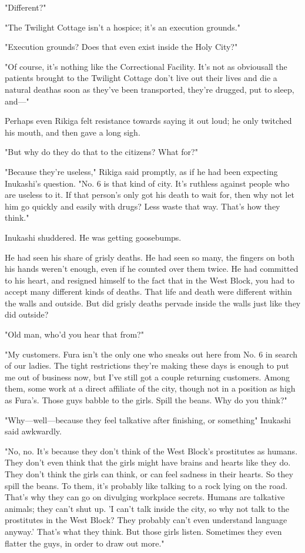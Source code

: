 "Different?"

"The Twilight Cottage isn't a hospice; it's an execution grounds."

"Execution grounds? Does that even exist inside the Holy City?"

"Of course, it's nothing like the Correctional Facility. It's not as
obvious\el all the patients brought to the Twilight Cottage don't live
out their lives and die a natural death\el as soon as they've been
transported, they're drugged, put to sleep, and---"

Perhaps even Rikiga felt resistance towards saying it out loud; he only
twitched his mouth, and then gave a long sigh.

"But why do they do that to the citizens? What for?"

"Because they're useless," Rikiga said promptly, as if he had been
expecting Inukashi's question. "No. 6 is that kind of city. It's
ruthless against people who are useless to it. If that person's only got
his death to wait for, then why not let him go quickly and easily with
drugs? Less waste that way. That's how they think."

Inukashi shuddered. He was getting goosebumps.

He had seen his share of grisly deaths. He had seen so many, the fingers
on both his hands weren't enough, even if he counted over them twice. He
had committed to his heart, and resigned himself to the fact that in the
West Block, you had to accept many different kinds of deaths. That life
and death were different within the walls and outside. But did grisly
deaths pervade inside the walls just like they did outside?

"Old man, who'd you hear that from?"

"My customers. Fura isn't the only one who sneaks out here from No. 6 in
search of our ladies. The tight restrictions they're making these days
is enough to put me out of business now, but I've still got a couple
returning customers. Among them, some work at a direct affiliate of the
city, though not in a position as high as Fura's. Those guys babble to
the girls. Spill the beans. Why do you think?"

"Why---well---because they feel talkative after finishing, or something\el "
Inukashi said awkwardly.

"No, no. It's because they don't think of the West Block's prostitutes
as humans. They don't even think that the girls might have brains and
hearts like they do. They don't think the girls can think, or can feel
sadness in their hearts. So they spill the beans. To them, it's probably
like talking to a rock lying on the road. That's why they can go on
divulging workplace secrets. Humans are talkative animals; they can't
shut up. 'I can't talk inside the city, so why not talk to the
prostitutes in the West Block? They probably can't even understand
language anyway.' That's what they think. But those girls listen.
Sometimes they even flatter the guys, in order to draw out more."

